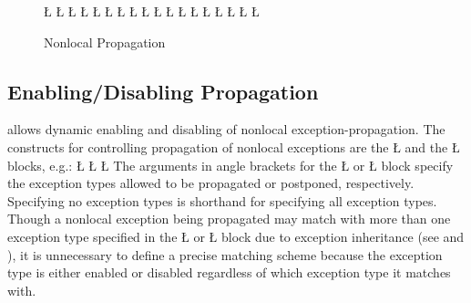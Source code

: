 \documentclass[openright,twoside]{report}
\begin{document}
\begin{figure}[htb]
\LGinlinefalse\LGbegin\lgrinde
\L{}
\L{}
\L{\LB{}}
\L{\LB{}}
\L{\LB{}}
\CE{}\L{\LB{}}
\L{\LB{}}
\CE{}\L{\LB{}}
\L{\LB{}}
\L{}
\L{}
\CE{}\L{\LB{}}
\L{\LB{\};}}
\L{}
\L{\LB{}}
\L{\LB{}}
\CE{}\L{\LB{}}
\CE{}\L{\LB{\}}}
\endlgrinde\LGend
\vspace{-4mm}
\caption{Nonlocal Propagation}
\label{f:NonlocalPropagation}
\end{figure}


\subsection{Enabling/Disabling Propagation}
\label{s:EnablingDisablingPropagation}

\uC allows dynamic enabling and disabling of nonlocal exception-propagation.
The constructs for controlling propagation of nonlocal exceptions are the \LGinlinetrue\LGbegin\lgrinde\L{}\endlgrinde\LGend{} and the \LGinlinetrue\LGbegin\lgrinde\L{}\endlgrinde\LGend{} blocks, e.g.:
\LGinlinefalse\LGbegin\lgrinde
\L{}
\L{\LB{}}
\CE{}\L{\LB{\}}}
\endlgrinde\LGend
The arguments in angle brackets for the \LGinlinetrue\LGbegin\lgrinde\L{}\endlgrinde\LGend{} or \LGinlinetrue\LGbegin\lgrinde\L{}\endlgrinde\LGend{} block specify the exception types allowed to be propagated or postponed, respectively.
Specifying no exception types is shorthand for specifying all exception types.
Though a nonlocal exception being propagated may match with more than one exception type specified in the \LGinlinetrue\LGbegin\lgrinde\L{}\endlgrinde\LGend{} or \LGinlinetrue\LGbegin\lgrinde\L{}\endlgrinde\LGend{} block due to exception inheritance (see  and ), it is unnecessary to define a precise matching scheme because the exception type is either enabled or disabled regardless of which exception type it matches with.
\end{document}

